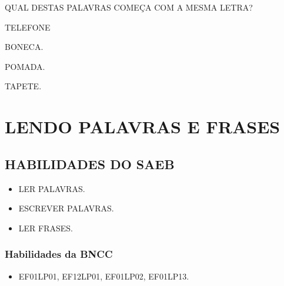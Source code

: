 
QUAL DESTAS PALAVRAS COMEÇA COM A MESMA LETRA?

\begin{multicols}{2}
\begin{escolha}
\item TELEFONE

\item BONECA.

\item POMADA.

\item TAPETE.
\end{escolha}
\end{multicols}



\chapter{LENDO PALAVRAS E FRASES}

\section*{HABILIDADES DO SAEB}

\begin{itemize}
\item LER PALAVRAS.

\item ESCREVER PALAVRAS.

\item LER FRASES.
\end{itemize}

\subsection{Habilidades da BNCC}

\begin{itemize}
\item EF01LP01, EF12LP01, EF01LP02, EF01LP13.
\end{itemize}


